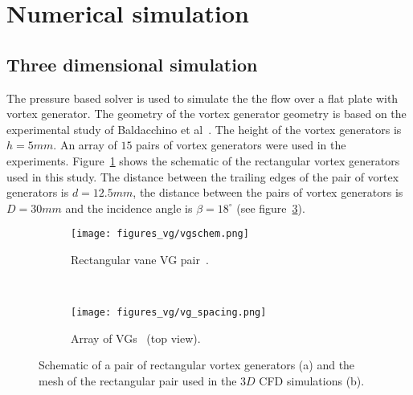 \section{Numerical simulation}\label{sec:cfdres}
\subsection{Three dimensional simulation}
The pressure based solver is used to simulate the the flow over a flat plate with vortex generator. The geometry of the vortex generator geometry is based on the experimental study of Baldacchino et al~\cite{Baldacchino_VG}. The height of the vortex generators is $h=5mm$. An array of $15$ pairs of vortex generators were used in the experiments.
Figure~\ref{fig:fpvgschem} shows the schematic of the rectangular vortex generators used in this study. The distance between the trailing edges of the pair of vortex generators is $d=12.5mm$, the distance between the pairs of vortex generators is $D=30mm$ and the incidence angle is $\beta=18^{\circ}$ (see figure~\ref{fig:vgdefn}).
\begin{figure}[h!]
    \centering
    \captionsetup{justification=centering}
    \begin{subfigure}[b]{0.4\textwidth}
    \centering
    \captionsetup{justification=centering}
        \texttt{[image: figures\_vg/vgschem.png]}
        \caption{Rectangular vane VG pair~\cite{Baldacchino_VG}.}
        \label{fig:fpvgschem}
    \end{subfigure}
    ~ %
    \begin{subfigure}[b]{0.48\textwidth}
    \centering
    \captionsetup{justification=centering}
        \texttt{[image: figures\_vg/vg\_spacing.png]}
        \caption{Array of VGs~\cite{Baldacchino_VG} (top view).}
        \label{fig:vgdefn}
    \end{subfigure}
    \caption{Schematic of a pair of rectangular vortex generators (a) and the mesh of the rectangular pair used in the $3D$ CFD simulations (b).}
\end{figure}

